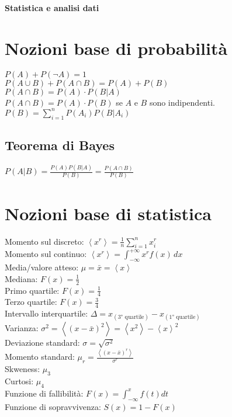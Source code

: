 \documentclass[10pt,landscape]{article}
\begin{document}
\raggedright
\footnotesize
\begin{multicols}{3}

\setlength{\premulticols}{1pt}
\setlength{\postmulticols}{1pt}
\setlength{\multicolsep}{1pt}
\setlength{\columnsep}{2pt}

{\Large{\textbf{Statistica e analisi dati}}}

\section{Nozioni base di probabilità}
$P(A) + P(\neg A) = 1$ \\
$P(A \cup B) + P(A \cap B) = P(A) + P(B)$ \\
$P(A \cap B) = P(A) \cdot P(B | A)$ \\
$P(A \cap B) = P(A) \cdot P(B)$ se $A$ e $B$ sono indipendenti. \\
$P(B) = \sum_{i=1}^n P(A_i) P(B | A_i)$ \\

\subsection{Teorema di Bayes}
$P(A | B) = \frac{P(A) P(B | A)}{P(B)} = \frac{P(A \cap B)}{P(B)}$ \\

\section{Nozioni base di statistica}

Momento sul discreto: $\left\langle x^r \right\rangle = \frac{1}{n} \sum_{i=1}^n x_i^r$ \\
Momento sul continuo: $\left\langle x^r \right\rangle = \int_{-\infty}^{+\infty} x^rf(x) \, dx$ \\
Media/valore atteso: $\mu = \bar{x} = \left\langle x \right\rangle$ \\
Mediana: $F(x) = \frac{1}{2}$ \\
Primo quartile: $F(x) = \frac{1}{4}$ \\
Terzo quartile: $F(x) = \frac{3}{4}$ \\
Intervallo interquartile: $\Delta = x_{(3\text{° quartile})} - x_{(1\text{° quartile})}$ \\
Varianza: $\sigma^2 = \left\langle \left( x - \bar{x} \right)^2 \right\rangle = \left\langle x^2 \right\rangle - \left\langle x \right\rangle^2$ \\
Deviazione standard: $\sigma = \sqrt{\sigma^2}$ \\
Momento standard: $\mu_r = \frac{\left\langle \left( x - \bar{x} \right)^r \right\rangle}{\sigma^r}$ \\
Skweness: $\mu_3$ \\
Curtosi: $\mu_4$ \\
Funzione di fallibilità: $F(x) = \int_{-\infty}^{x} f(t)dt$ \\
Funzione di sopravvivenza: $S(x) = 1 - F(x)$ \\


\end{multicols}
\end{document}
